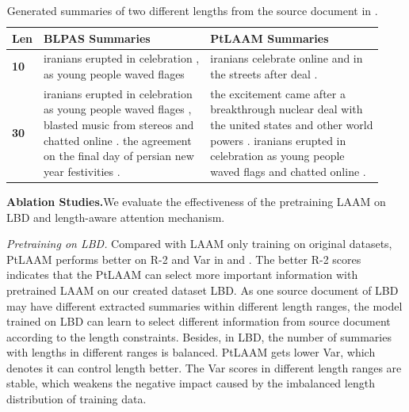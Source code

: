 \begin{table}[th!]
	\centering
	\scriptsize
	\begin{tabular}{|p{0.3cm}|p{3cm}|p{3cm}|}
		\hline 
         \bf Len & \bf BLPAS Summaries & \bf PtLAAM Summaries\\
		\hline 
		\bf 10 & \tabincell{l}{iranians erupted in celebration , \\ as young people waved flages } & \tabincell{l}{iranians celebrate online and in \\ the streets after deal .}\\
		\hline
		\bf 30 & \tabincell{l}{iranians erupted in celebration \\ as young people waved flages , \\ blasted music from stereos and \\ chatted online . the agreement \\ on the final day of persian new \\ year festivities .} 
		& \tabincell{l}{
		the excitement came after a \\ breakthrough nuclear deal with \\ the united states and other world \\powers . iranians erupted in \\celebration as young people \\ waved flags and chatted online .}
		\\
		\hline 
	\end{tabular}
	\caption{Generated summaries of two different lengths from the source document in .\label{tab:exp} 
}
\end{table}


{\bf Ablation Studies.}We evaluate the effectiveness of the pretraining LAAM on LBD and length-aware attention mechanism.

\textit{Pretraining on LBD.} 
Compared with LAAM only training on original datasets, PtLAAM performs better on R-2 and Var in  and .
The better R-2 scores indicates that the PtLAAM can select more important information with pretrained LAAM on our created dataset LBD.
As one source document of LBD may have different extracted summaries within different length ranges, the model trained on LBD can learn to select different information from source document according to the length constraints.
Besides, in LBD, the number of summaries with lengths in different ranges is balanced.
PtLAAM gets lower Var, which denotes it can control length better.
The Var scores in different length ranges are stable, which 
weakens the negative impact caused by the imbalanced length distribution of training data. 

